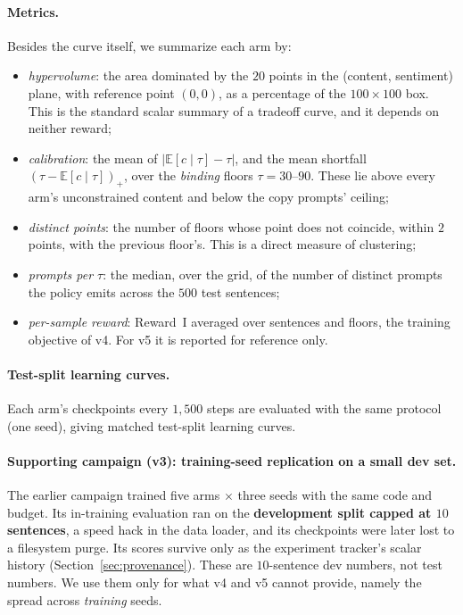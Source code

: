 \paragraph{Metrics.}
Besides the curve itself, we summarize each arm by:
\begin{itemize}[itemsep=1pt,topsep=2pt]
  \item \emph{hypervolume}: the area dominated by the $20$ points in the
        (content, sentiment) plane, with reference point $(0,0)$, as a
        percentage of the $100\times100$ box. This is the standard scalar
        summary of a tradeoff curve, and it depends on neither reward;
  \item \emph{calibration}: the mean of $|\mathbb{E}[c\mid\tau] - \tau|$, and
        the mean shortfall $(\tau - \mathbb{E}[c\mid\tau])_+$, over the
        \emph{binding} floors $\tau = 30$--$90$. These lie above every arm's
        unconstrained content and below the copy prompts' ceiling;
  \item \emph{distinct points}: the number of floors whose point does not
        coincide, within $2$ points, with the previous floor's. This is a
        direct measure of clustering;
  \item \emph{prompts per $\tau$}: the median, over the grid, of the number of
        distinct prompts the policy emits across the $500$ test sentences;
  \item \emph{per-sample reward}: Reward~I averaged over sentences and floors,
        the training objective of v4. For v5 it is reported for reference only.
\end{itemize}

\paragraph{Test-split learning curves.}
Each arm's checkpoints every $1{,}500$ steps are evaluated with the same
protocol (one seed), giving matched test-split learning curves.

\paragraph{Supporting campaign (v3): training-seed replication on a small dev set.}
The earlier campaign trained five arms $\times$ three seeds with the same code
and budget. Its in-training evaluation ran on the \textbf{development split
capped at $10$ sentences}, a speed hack in the data loader, and its checkpoints
were later lost to a filesystem purge. Its scores survive only as the
experiment tracker's scalar history (Section~\ref{sec:provenance}). These are
$10$-sentence dev numbers, not test numbers. We use them only for what v4 and v5
cannot provide, namely the spread across \emph{training} seeds.

